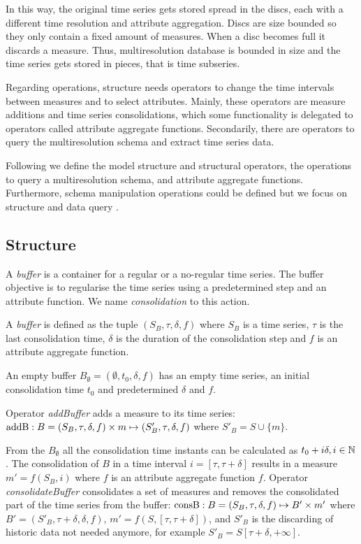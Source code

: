 In this way, the original time series gets stored spread in the discs,
each with a different time resolution and attribute aggregation.
Discs are size bounded so they only contain a fixed amount of
measures. When a disc becomes full it discards a measure. Thus,
multiresolution database is bounded in size and the time series gets
stored in pieces, that is time subseries.

Regarding operations,  structure needs operators to change
the time intervals between measures and to select attributes. Mainly,
these operators are measure additions and time series consolidations,
which some functionality is delegated to operators called attribute
aggregate functions. Secondarily, there are operators to query the
multiresolution schema and extract time series data.


Following we define the  model structure and structural
operators, the operations to query a multiresolution schema, and
attribute aggregate functions.  Furthermore, schema manipulation
operations could be defined but we focus on structure and data query .


\subsection{Structure}

A \emph{buffer} is a container for a regular or a no-regular time
series. The buffer objective is to regularise the time series using a
predetermined step and an attribute function. We name
\emph{consolidation} to this action.
\begin{definition}%
  A \emph{buffer} is defined as the tuple $(S_B,\tau,\delta,f)$ where
  $S_B$ is a time series, $\tau$ is the last consolidation time,
  $\delta$ is the duration of the consolidation step and $f$ is an
  attribute aggregate function.

  An empty buffer $B_{\emptyset} = (\emptyset,t_0, \delta, f)$ has an
  empty time series, an initial consolidation time $t_0$ and
  predetermined $\delta$ and $f$.
\end{definition}

Operator \emph{addBuffer} adds a measure to its time series:
$\operatorname{addB}: B = (S_B,\tau,\delta,f) \times m \mapsto
(S'_B,\tau,\delta,f)$ where $S'_B = S \cup \{m\} $.

From the $B_{\emptyset}$ all the consolidation time instants can be
calculated as $t_0+i\delta, i\in\mathbb{N}$. The consolidation of $B$ in a
time interval $i=[\tau,\tau+\delta]$ results in a measure
$m'=f(S_B,i)$ where $f$ is an attribute aggregate function
$f$. Operator \emph{consolidateBuffer} consolidates a set of measures
and removes the consolidated part of the time series from the buffer:
$\operatorname{consB} : B=(S_B,\tau,\delta,f) \mapsto B' \times m'$ where $ B'=
(S'_B,\tau+\delta,\delta,f)$, $m' = f(S,[\tau,\tau+\delta])$, and
$S'_B$ is the discarding of historic data not needed anymore, for example
$S'_B = S[\tau+\delta,+\infty]$.

